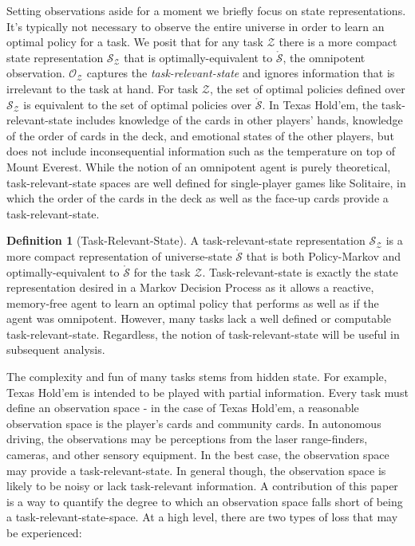 \documentclass{article} %
\theoremstyle{definition}
\newtheorem{definition}{Definition}[section]
\begin{document}
Setting observations aside for a moment we briefly focus on state
representations. It's typically not necessary to observe the entire
universe in order to learn an optimal policy for a task. We posit that
for any task $\mathcal{Z}$ there is a more compact state
representation $\mathcal{S}_\mathcal{Z}$ that is optimally-equivalent
to $\mathring{\mathcal{S}}$, the omnipotent
observation. $\mathcal{O}_\mathcal{Z}$ captures the
\textit{task-relevant-state} and ignores information that is
irrelevant to the task at hand. For task $\mathcal{Z}$, the set of
optimal policies defined over $\mathcal{S}_\mathcal{Z}$ is equivalent
to the set of optimal policies over $\mathring{\mathcal{S}}$. In Texas
Hold'em, the task-relevant-state includes knowledge of the cards in
other players' hands, knowledge of the order of cards in the deck, and
emotional states of the other players, but does not include
inconsequential information such as the temperature on top of Mount
Everest. While the notion of an omnipotent agent is purely
theoretical, task-relevant-state spaces are well defined for
single-player games like Solitaire, in which the order of the cards in
the deck as well as the face-up cards provide a task-relevant-state.

\begin{definition}[Task-Relevant-State]
\label{def:taskRelState}
A task-relevant-state representation $\mathcal{S}_\mathcal{Z}$ is a
more compact representation of universe-state $\mathring{\mathcal{S}}$
that is both Policy-Markov and optimally-equivalent to
$\mathring{\mathcal{S}}$ for the task
$\mathcal{Z}$. Task-relevant-state is exactly the state representation
desired in a Markov Decision Process as it allows a reactive,
memory-free agent to learn an optimal policy that performs as well as
if the agent was omnipotent. However, many tasks lack a well defined
or computable task-relevant-state. Regardless, the notion of
task-relevant-state will be useful in subsequent analysis.
\end{definition}

The complexity and fun of many tasks stems from hidden state. For
example, Texas Hold'em is intended to be played with partial
information. Every task must define an observation space - in the case
of Texas Hold'em, a reasonable observation space is the player's cards
and community cards. In autonomous driving, the observations may be
perceptions from the laser range-finders, cameras, and other sensory
equipment. In the best case, the observation space may provide a
task-relevant-state. In general though, the observation space is
likely to be noisy or lack task-relevant information. A contribution
of this paper is a way to quantify the degree to which an observation
space falls short of being a task-relevant-state-space. At a high
level, there are two types of loss that may be experienced:
\end{document}
